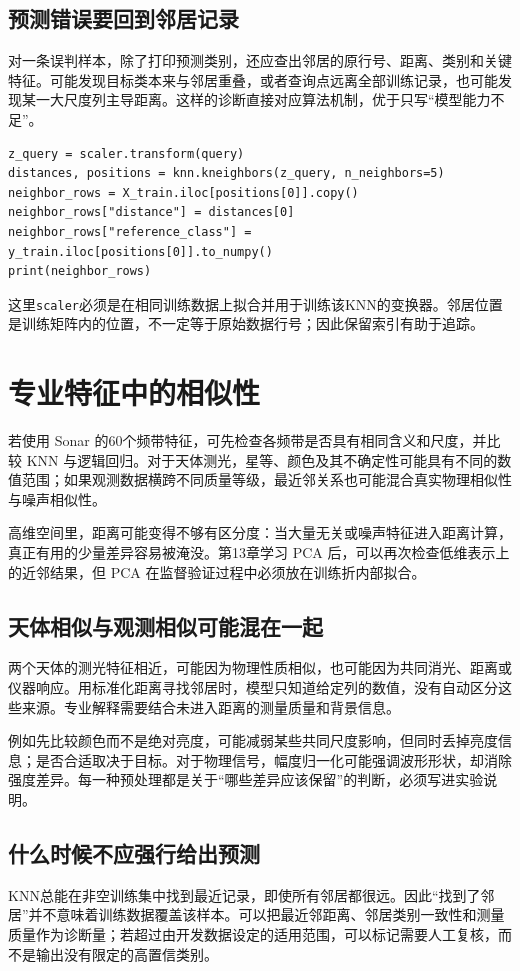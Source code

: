 \subsection{预测错误要回到邻居记录}
对一条误判样本，除了打印预测类别，还应查出邻居的原行号、距离、类别和关键特征。可能发现目标类本来与邻居重叠，或者查询点远离全部训练记录，也可能发现某一大尺度列主导距离。这样的诊断直接对应算法机制，优于只写“模型能力不足”。

\begin{lstlisting}[caption={在已经拟合的缩放器与KNN中追踪邻居}]
z_query = scaler.transform(query)
distances, positions = knn.kneighbors(z_query, n_neighbors=5)
neighbor_rows = X_train.iloc[positions[0]].copy()
neighbor_rows["distance"] = distances[0]
neighbor_rows["reference_class"] = y_train.iloc[positions[0]].to_numpy()
print(neighbor_rows)
\end{lstlisting}
这里\texttt{scaler}必须是在相同训练数据上拟合并用于训练该KNN的变换器。邻居位置是训练矩阵内的位置，不一定等于原始数据行号；因此保留索引有助于追踪。

\section{专业特征中的相似性}
若使用 Sonar 的60个频带特征，可先检查各频带是否具有相同含义和尺度，并比较 KNN 与逻辑回归。对于天体测光，星等、颜色及其不确定性可能具有不同的数值范围；如果观测数据横跨不同质量等级，最近邻关系也可能混合真实物理相似性与噪声相似性。

高维空间里，距离可能变得不够有区分度：当大量无关或噪声特征进入距离计算，真正有用的少量差异容易被淹没。第13章学习 PCA 后，可以再次检查低维表示上的近邻结果，但 PCA 在监督验证过程中必须放在训练折内部拟合。

\subsection{天体相似与观测相似可能混在一起}
两个天体的测光特征相近，可能因为物理性质相似，也可能因为共同消光、距离或仪器响应。用标准化距离寻找邻居时，模型只知道给定列的数值，没有自动区分这些来源。专业解释需要结合未进入距离的测量质量和背景信息。

例如先比较颜色而不是绝对亮度，可能减弱某些共同尺度影响，但同时丢掉亮度信息；是否合适取决于目标。对于物理信号，幅度归一化可能强调波形形状，却消除强度差异。每一种预处理都是关于“哪些差异应该保留”的判断，必须写进实验说明。

\subsection{什么时候不应强行给出预测}
KNN总能在非空训练集中找到最近记录，即使所有邻居都很远。因此“找到了邻居”并不意味着训练数据覆盖该样本。可以把最近邻距离、邻居类别一致性和测量质量作为诊断量；若超过由开发数据设定的适用范围，可以标记需要人工复核，而不是输出没有限定的高置信类别。

